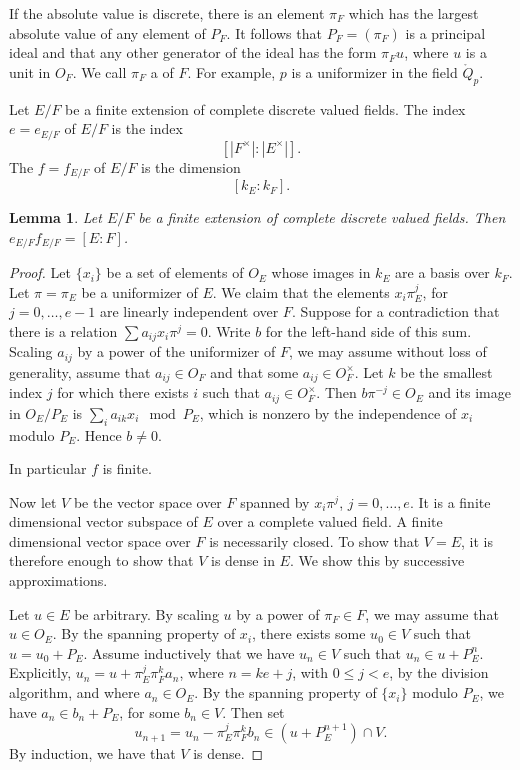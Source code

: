 \documentclass{amsart}
\newtheorem{lemma}[equation]{Lemma}
\def\abs#1{{|#1|}}
\begin{document}
If the absolute value is discrete, there is an element $\pi_F$ which
has the largest absolute value of any element of $P_F$.  It follows
that $P_F = (\pi_F)$ is a principal ideal and that any other generator
of the ideal has the form $\pi_F u$, where $u$ is a unit in $O_F$.  We
call $\pi_F$ a  of $F$.  For example, $p$ is a
uniformizer in the field $\ring{Q}_p$.

Let $E/F$ be a finite extension of complete discrete valued fields.
The  index $e=e_{E/F}$ of $E/F$ is the index
\[
[\abs{F^\times}:\abs{E^\times}].
\]
The  $f=f_{E/F}$ of $E/F$ is the dimension
\[
[k_E:k_F].
\]



\begin{lemma} Let $E/F$ be a finite extension of complete discrete valued fields.
Then $e_{E/F} f_{E/F} = [E:F]$.
\end{lemma}

\begin{proof} Let $\{x_i\}$ be a set of elements of $O_E$ whose images
  in $k_E$ are a basis over $k_F$.  Let $\pi=\pi_E$ be a
  uniformizer of $E$.  We claim that the elements $x_i\pi^j_E$, for
  $j=0,\ldots,e-1$ are linearly independent over $F$.  Suppose for a
  contradiction that there is a relation $\sum a_{ij} x_i \pi^j=0$.
  Write $b$ for the left-hand side of this sum.  Scaling $a_{ij}$ by a
  power of the uniformizer of $F$, we may assume without loss of
  generality, assume that $a_{ij}\in O_F$ and that some $a_{ij}\in
  O_F^\times$.  Let $k$ be the smallest index $j$ for which there
  exists $i$ such that $a_{ij}\in O_F^\times$.  Then $b \pi^{-j} \in
  O_E$ and its image in $O_E/P_E$ is $\sum_i a_{ik} x_i \mod
  P_E$, which is nonzero by the independence of $x_i$ modulo $P_E$.
  Hence $b\ne 0$.

  In particular $f$ is finite.  

  Now let $V$ be the vector space over $F$ spanned by $x_i\pi^j$, $j=0,\ldots, e$.
  It is a finite dimensional vector subspace of $E$
  over a complete valued field.  A finite dimensional vector space over $F$ is necessarily
  closed.  To show that $V=E$, it is therefore enough to show that $V$ is dense in $E$.
  We show this by successive approximations.

  Let $u\in E$ be arbitrary. By scaling $u$ by a power of $\pi_F\in
  F$, we may assume that $u\in O_E$.  By the spanning property of
  $x_i$, there exists some $u_0 \in V$ such that $u = u_0 + P_E$.
  Assume inductively that we have $u_n\in V$ such that $u_n \in u +
  P_E^n$.  Explicitly, $u_n = u + \pi_E^j\pi_F^k a_n$, where $n = k e +j$, with $0\le j<e$, 
  by the division
  algorithm, and where $a_n \in O_E$.  By the spanning property of $\{x_i\}$ modulo $P_E$,
  we have $a_n \in b_n + P_E$, for some $b_n\in V$.  Then set
  \[
  u_{n+1} = u_n - \pi_E^j\pi_F^k b_n \in (u + P_E^{n+1}) \cap V.
  \]
  By induction, we have that $V$ is dense.
\end{proof}
\end{document}
